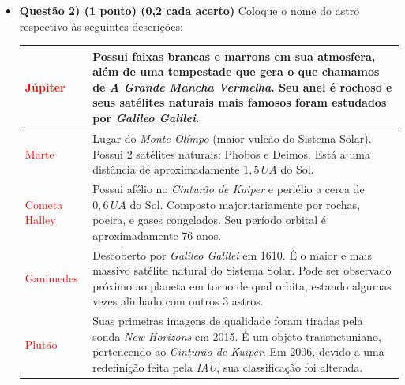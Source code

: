 \documentclass[a4paper, 12pt]{article}
\newcommand{\red}[1]{\textcolor{red}{#1}}
\begin{document}
\begin{flushleft}
\begin{itemize}
		\item \textbf{Questão 2) (1 ponto) (0,2 cada acerto)} Coloque o nome do astro respectivo às seguintes descrições:
			\begin{center} \begin{tabular}{|M{0.2\textwidth}|M{0.65\textwidth}|}
				\hline
				\red{Júpiter} & Possui faixas brancas e marrons em sua atmosfera, além de uma tempestade que gera o que chamamos de \textit{A Grande Mancha Vermelha}. Seu anel é rochoso e seus satélites naturais mais famosos foram estudados por \textit{Galileo Galilei}. \\ \hline
				\red{Marte} & Lugar do \textit{Monte Olímpo} (maior vulcão do Sistema Solar). Possui 2 satélites naturais: Phobos e Deimos. Está a uma distância de aproximadamente $1,5 \, UA$ do Sol. \\ \hline
				\red{Cometa Halley} & Possui afélio no \textit{Cinturão de Kuiper} e periélio a cerca de $0,6 \, UA$ do Sol. Composto majoritariamente por rochas, poeira, e gases congelados. Seu período orbital é aproximadamente $76$ anos. \\ \hline
				\red{Ganimedes} & Descoberto por \textit{Galileo Galilei} em 1610. É o maior e mais massivo satélite natural do Sistema Solar. Pode ser observado próximo ao planeta em torno de qual orbita, estando algumas vezes alinhado com outros 3 astros.  \\ \hline
				\red{Plutão} & Suas primeiras imagens de qualidade foram tiradas pela sonda \textit{New Horizons} em 2015. É um objeto transnetuniano, pertencendo ao \textit{Cinturão de Kuiper}. Em 2006, devido a uma redefinição feita pela \textit{IAU}, sua classificação foi alterada. \\ \hline
			\end{tabular} \end{center}


\end{itemize}
\end{flushleft}
\end{document}
